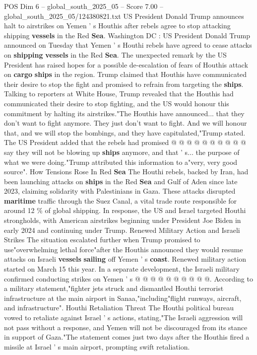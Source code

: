 \begin{textsample}{POS Dim 6 – global\_south\_2025\_05 – Score 7.00 – global\_south\_2025\_05/124380821.txt}  \label{ex:f6_pos_038}
US President Donald Trump announces halt to airstrikes on Yemen ' s Houthis after rebels agree to stop attacking shipping \textbf{vessels} in the Red \textbf{Sea}.
Washington DC : US President Donald Trump announced on Tuesday that Yemen ' s Houthi rebels have agreed to cease attacks on \textbf{shipping} \textbf{vessels} in the Red \textbf{Sea}.
The unexpected remark by the US President has raised hopes for a possible de-escalation of fears of Houthis attack on \textbf{cargo} \textbf{ships} in the region.
Trump claimed that Houthis have communicated their desire to stop the fight and promised to refrain from targeting the \textbf{ships}.
Talking to reporters at White House, Trump revealed that the Houthis had communicated their desire to stop fighting, and the US would honour this commitment by halting its airstrikes."The Houthis have announced... that they don't want to fight anymore.
They just don't want to fight.
And we will honour that, and we will stop the bombings, and they have capitulated,"Trump stated.
The US President added that the rebels had promised @ @ @ @ @ @ @ @ @ @ say they will not be blowing up \textbf{ships} anymore, and that ' s... the purpose of what we were doing."Trump attributed this information to a"very, very good source".
How Tensions Rose In Red \textbf{Sea} The Houthi rebels, backed by Iran, had been launching attacks on \textbf{ships} in the Red \textbf{Sea} and Gulf of Aden since late 2023, claiming solidarity with Palestinians in Gaza.
These attacks disrupted \textbf{maritime} traffic through the Suez Canal, a vital trade route responsible for around 12 \% of global shipping.
In response, the US and Israel targeted Houthi strongholds, with American airstrikes beginning under President Joe Biden in early 2024 and continuing under Trump.
Renewed Military Action and Israeli Strikes The situation escalated further when Trump promised to use"overwhelming lethal force"after the Houthis announced they would resume attacks on Israeli \textbf{vessels} \textbf{sailing} off Yemen ' s \textbf{coast}.
Renewed military action started on March 15 this year.
In a separate development, the Israeli military confirmed conducting strikes on Yemen ' s @ @ @ @ @ @ @ @ @ @.
According to a military statement,"fighter jets struck and dismantled Houthi terrorist infrastructure at the main airport in Sanaa,"including"flight runways, aircraft, and infrastructure".
Houthi Retaliation Threat The Houthi political bureau vowed to retaliate against Israel ' s actions, stating,"The Israeli aggression will not pass without a response, and Yemen will not be discouraged from its stance in support of Gaza."The statement comes just two days after the Houthis fired a missile at Israel ' s main airport, prompting swift retaliation.

\end{textsample}
